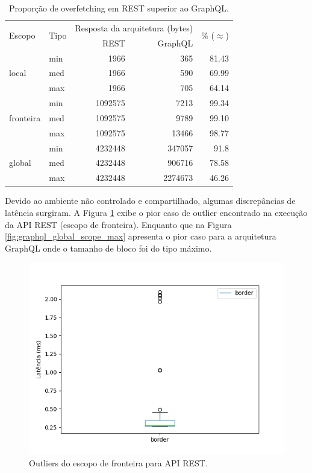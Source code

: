 \documentclass[conference]{IEEEtran}
\begin{document}
\begin{table}
\renewcommand{\arraystretch}{1.3}
\caption{Proporção de overfetching em REST superior ao GraphQL.}
\label{tab:prop_overfetching}
\centering
\begin{tabular}{ll|rrr}
    \multirow{2}{*}{Escopo} & \multirow{2}{*}{Tipo} & \multicolumn{2}{c}{Resposta da arquitetura (bytes)} & \multirow{2}{*}{\% ($\approx$)}\\
    && REST & GraphQL & \\
    \hline
    \multirow{3}{*}{local} & min & 1966 & 365 & 81.43\\
    & med & 1966 & 590 & 69.99\\
    & max & 1966 & 705 & 64.14\\
    \multirow{3}{*}{fronteira} & min & 1092575 & 7213 & 99.34\\
    & med & 1092575 & 9789 & 99.10\\
    & max & 1092575 & 13466 & 98.77\\
    \multirow{3}{*}{global} & min & 4232448 & 347057 & 91.8\\
    & med & 4232448 & 906716 & 78.58\\
    & max & 4232448 & 2274673 & 46.26
\end{tabular}
\end{table}

Devido ao ambiente não controlado e compartilhado, algumas discrepâncias de latência surgiram. A Figura \ref{fig:rest_border_scope} exibe o pior caso de outlier encontrado na execução da API REST (escopo de fronteira). Enquanto que na Figura \ref{fig:graphql_global_scope_max} apresenta o pior caso para a arquitetura GraphQL onde o tamanho de bloco foi do tipo máximo.

\begin{figure}[htbp]
\centerline{\includegraphics[scale=0.50]{imgs/rest_time/border_rest.png}}
\caption{Outliers do escopo de fronteira para API REST.}
\label{fig:rest_border_scope}
\end{figure}
\end{document}
